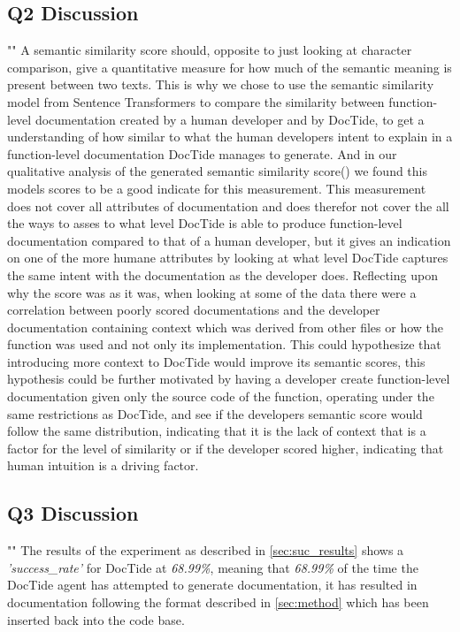 \subsection{Q2 Discussion}
\label{sec:DiscussionQ2}
"\textit{\subquestionII}"
A semantic similarity score should, opposite to just looking at character comparison, give a quantitative measure for how much of the semantic meaning is present between two texts. This is why we chose to use the semantic similarity model from Sentence Transformers to compare the similarity between function-level documentation created by a human developer and by DocTide, to get a understanding of how similar to what the human developers intent to explain in a function-level documentation DocTide manages to generate. And in our qualitative analysis of the generated semantic similarity score() we found this models scores to be a good indicate for this measurement. This measurement does not cover all attributes of documentation and does therefor not cover the all the ways to asses to what level DocTide is able to produce function-level documentation compared to that of a human developer, but it gives an indication on one of the more humane attributes by looking at what level DocTide captures the same intent with the documentation as the developer does.
Reflecting upon why the score was as it was, when looking at some of the data there were a correlation between poorly scored documentations and the developer documentation containing context which was derived from other files or how the function was used and not only its implementation. 
This could hypothesize that introducing more context to DocTide would improve its semantic scores, this hypothesis could be further motivated by having a developer create function-level documentation given only the source code of the function, operating under the same restrictions as DocTide, and see if the developers semantic score would follow the same distribution, indicating that it is the lack of context that is a factor for the level of similarity or if the developer scored higher, indicating that human intuition is a driving factor.
\subsection{Q3 Discussion}
\label{sec:DiscussionQ3}
"\textit{\subquestionIII}"
The results of the experiment as described in \cref{sec:suc_results} shows a \textit{'success\_rate'} for DocTide at \textit{68.99\%}, meaning that \textit{68.99\%} of the time the DocTide agent has attempted to generate documentation, it has resulted in documentation following the format described in \cref{sec:method} which has been inserted back into the code base. 
